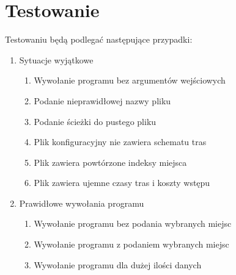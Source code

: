 \documentclass{article}
\begin{document}
\section{Testowanie}
Testowaniu będą podlegać następujące przypadki:
\begin{enumerate}
    \item Sytuacje wyjątkowe \begin{enumerate}
        \item Wywołanie programu bez argumentów wejściowych
        \item Podanie nieprawidłowej nazwy pliku
        \item Podanie ścieżki do pustego pliku
        \item Plik konfiguracyjny nie zawiera schematu tras
        \item Plik zawiera powtórzone indeksy miejsca
        \item Plik zawiera ujemne czasy tras i koszty wstępu
    \end{enumerate}
    \item Prawidłowe wywołania programu \begin{enumerate}
        \item Wywołanie programu bez podania wybranych miejsc
        \item Wywołanie programu z podaniem wybranych miejsc
        \item Wywołanie programu dla dużej ilości danych
    \end{enumerate}
\end{enumerate}
\end{document}
